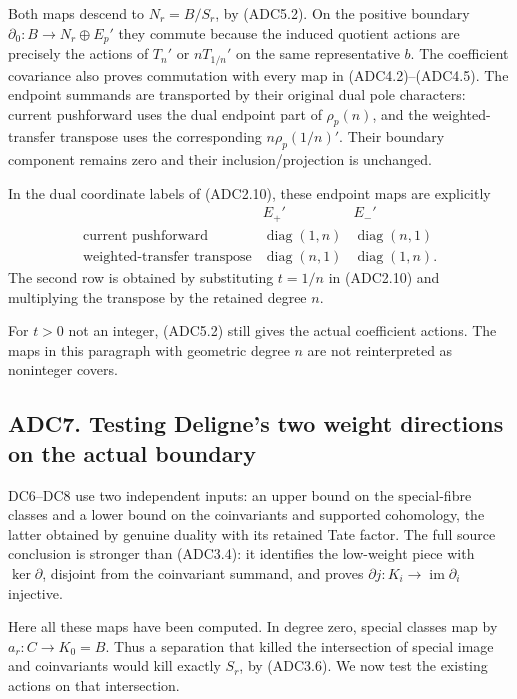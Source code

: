 Both maps descend to \(N_r=B/S_r\), by (ADC5.2). On the positive
boundary \(\partial_0:B\to N_r\oplus E_p'\) they commute because the
induced quotient actions are precisely the actions of \(T_n'\) or
\(nT_{1/n}'\) on the same representative \(b\). The coefficient
covariance also proves commutation with every map in (ADC4.2)--(ADC4.5).
The endpoint summands are transported by their original dual pole
characters: current pushforward uses the dual endpoint part of
\(\rho_p(n)\), and the weighted-transfer transpose uses the
corresponding \(n\rho_p(1/n)'\). Their boundary component remains zero
and their inclusion/projection is unchanged.

In the dual coordinate labels of (ADC2.10), these endpoint maps are
explicitly \[
\begin{array}{c|cc}
&E_+'&E_-'\\ \hline
\text{current pushforward}&\operatorname{diag}(1,n)&\operatorname{diag}(n,1)\\
\text{weighted-transfer transpose}&\operatorname{diag}(n,1)&\operatorname{diag}(1,n).
\end{array}
\tag{ADC6.5}
\] The second row is obtained by substituting \(t=1/n\) in (ADC2.10) and
multiplying the transpose by the retained degree \(n\).

For \(t>0\) not an integer, (ADC5.2) still gives the actual coefficient
actions. The maps in this paragraph with geometric degree \(n\) are not
reinterpreted as noninteger covers.

\subsection{ADC7. Testing Deligne's two weight directions on the actual
boundary}\label{adc7.-testing-delignes-two-weight-directions-on-the-actual-boundary}

DC6--DC8 use two independent inputs: an upper bound on the special-fibre
classes and a lower bound on the coinvariants and supported cohomology,
the latter obtained by genuine duality with its retained Tate factor.
The full source conclusion is stronger than (ADC3.4): it identifies the
low-weight piece with \(\ker\partial\), disjoint from the coinvariant
summand, and proves \(\partial j:K_i\to\operatorname{im}\partial_i\)
injective.

Here all these maps have been computed. In degree zero, special classes
map by \(a_r:C\to K_0=B\). Thus a separation that killed the
intersection of special image and coinvariants would kill exactly
\(S_r\), by (ADC3.6). We now test the existing actions on that
intersection.

